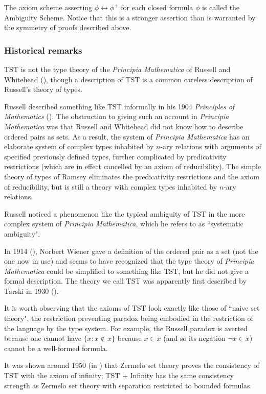 \documentclass[112pt]{article}
\begin{document}
The axiom scheme asserting $\phi \leftrightarrow \phi^+$ for each closed formula $\phi$ is called the Ambiguity Scheme.   Notice that this is a stronger assertion than is warranted by the symmetry of proofs described above.

\subsubsection{Historical remarks}

TST is not the type theory of the {\em Principia Mathematica\/} of Russell and Whitehead (\cite{pm}), though a description of TST is a common careless description of Russell's theory of types.

Russell described something like TST informally in his 1904 {\em Principles of Mathematics\/} (\cite{pm1}).  The obstruction to giving such an account in {\em Principia Mathematica\/} was that
Russell and Whitehead did not know how to describe ordered pairs as sets.  As a result, the system of {\em Principia Mathematica\/} has an elaborate system of  complex
types inhabited by $n$-ary relations with arguments of specified previously defined types, further complicated by predicativity restrictions (which are in effect cancelled by an axiom of reducibility).
The simple theory of types of Ramsey eliminates the predicativity restrictions and the axiom of reducibility, but is still a theory with complex types inhabited by $n$-ary relations.

Russell noticed a phenomenon like the typical ambiguity of TST in the more complex system of {\em Principia Mathematica\/}, which he refers to as ``systematic ambiguity".

In 1914 (\cite{wiener}), Norbert Wiener gave a definition of the ordered pair as a set (not the one now in use) and seems to have recognized that the type theory of {\em Principia Mathematica\/} could be simplified to something like TST, but he did not give a formal description.  The theory we call TST was apparently first described by Tarski in 1930 (\cite{tarskiontst}).

It is worth observing that the axioms of TST look exactly like those of ``naive set theory", the restriction preventing paradox being embodied in the restriction of the language by the type system.
For example, the Russell paradox is averted because one cannot have $\{x:x \not\in x\}$ because $x \in x$ (and so its negation $\neg x \in x$) cannot be a well-formed formula.

It was shown around 1950 (in \cite{kemeny}) that Zermelo set theory proves the consistency of TST with the axiom of infinity;  TST + Infinity has the same consistency strength as
Zermelo set theory with separation restricted to bounded formulas.
\end{document}
